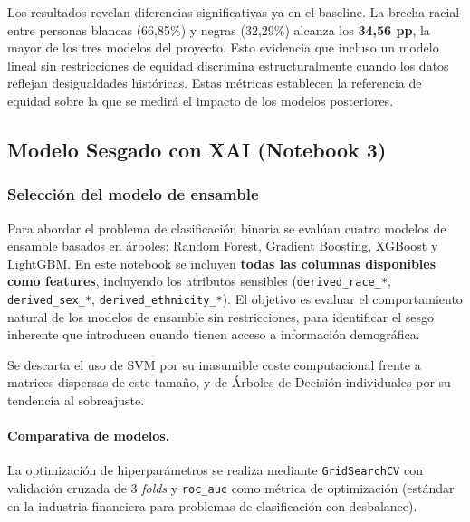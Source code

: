 \documentclass[11pt,a4paper]{article}
\begin{document}
Los resultados revelan diferencias significativas ya en el baseline. La brecha racial entre personas
blancas (66{,}85\%) y negras (32{,}29\%) alcanza los \textbf{34{,}56 pp}, la mayor de los tres
modelos del proyecto. Esto evidencia que incluso un modelo lineal sin restricciones de equidad discrimina
estructuralmente cuando los datos reflejan desigualdades históricas.
Estas métricas establecen la referencia de equidad sobre la que se medirá el impacto de los modelos
posteriores.

\newpage
\subsection{Modelo Sesgado con XAI (Notebook 3)}

\subsubsection{Selección del modelo de ensamble}

Para abordar el problema de clasificación binaria se evalúan cuatro modelos de ensamble basados
en árboles: Random Forest, Gradient Boosting, XGBoost y LightGBM. En este notebook se incluyen
\textbf{todas las columnas disponibles como features}, incluyendo los atributos sensibles
(\texttt{derived\_race\_*}, \texttt{derived\_sex\_*}, \texttt{derived\_ethnicity\_*}). El objetivo
es evaluar el comportamiento natural de los modelos de ensamble sin restricciones, para identificar
el sesgo inherente que introducen cuando tienen acceso a información demográfica.

Se descarta el uso de SVM por su inasumible coste computacional frente a matrices dispersas de
este tamaño, y de Árboles de Decisión individuales por su tendencia al sobreajuste.

\paragraph{Comparativa de modelos.}

La optimización de hiperparámetros se realiza mediante \texttt{GridSearchCV} con validación cruzada
de 3 \textit{folds} y \texttt{roc\_auc} como métrica de optimización (estándar en la industria
financiera para problemas de clasificación con desbalance).
\end{document}
